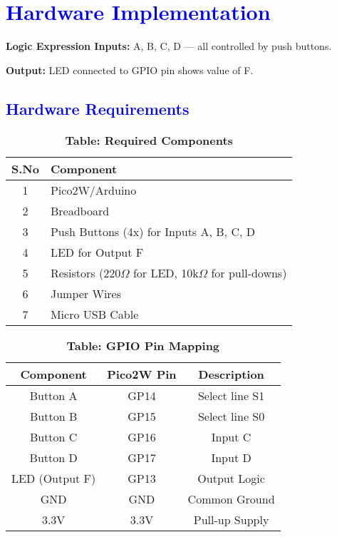 \documentclass[twocolumn]{article}
\begin{document}
\section*{\textcolor{blue}{Hardware Implementation }}

\textbf{Logic Expression Inputs:} A, B, C, D — all controlled by push buttons.

\textbf{Output:} LED connected to GPIO pin shows value of F.

\subsection*{\textcolor{blue}{Hardware Requirements}}

\begin{table}[h]
\centering
\renewcommand{\arraystretch}{1.3}
\begin{tabular}{|c|l|}
\hline
\textbf{S.No} & \textbf{Component} \\ \hline
1 & Pico2W/Arduino \\
2 & Breadboard \\
3 & Push Buttons (4x) for Inputs A, B, C, D \\
4 & LED for Output F \\
5 & Resistors (220$\Omega$ for LED, 10k$\Omega$ for pull-downs) \\
6 & Jumper Wires \\
7 & Micro USB Cable \\
\hline
\end{tabular}
\caption*{\textbf{Table: Required Components}}
\end{table}


\begin{table}[h]
\centering
\renewcommand{\arraystretch}{1.3}
\begin{tabular}{|c|c|c|}
\hline
\textbf{Component} & \textbf{Pico2W Pin} & \textbf{Description} \\
\hline
Button A & GP14 & Select line S1 \\
Button B & GP15 & Select line S0 \\
Button C & GP16 & Input C \\
Button D & GP17 & Input D \\
LED (Output F) & GP13 & Output Logic \\
GND & GND & Common Ground \\
3.3V & 3.3V & Pull-up Supply \\
\hline
\end{tabular}
\caption*{\textbf{Table: GPIO Pin Mapping}}
\end{table}
\end{document}
